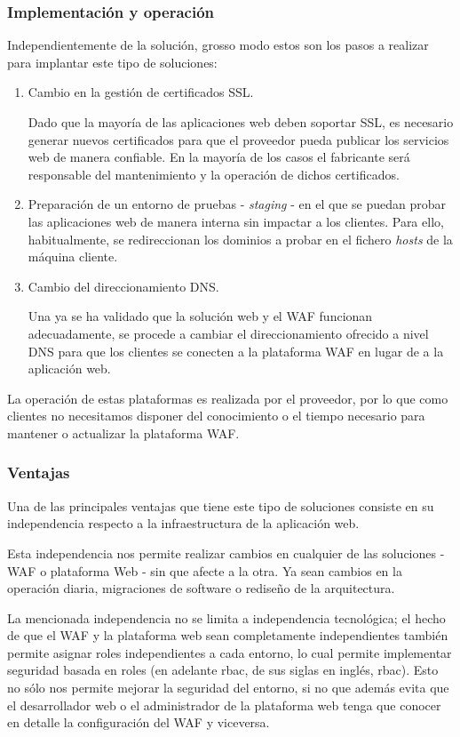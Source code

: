 \subsubsection{Implementación y operación}
\par Independientemente de la solución, grosso modo estos son los pasos a realizar para implantar este tipo de soluciones:
\begin{enumerate}
  \item Cambio en la gestión de certificados SSL.
    \par Dado que la mayoría de las aplicaciones web deben soportar SSL, es necesario generar nuevos certificados para que el proveedor pueda
    publicar los servicios web de manera confiable. En la mayoría de los casos el fabricante será responsable del mantenimiento y la operación
    de dichos certificados.
  \item Preparación de un entorno de pruebas - {\em staging} - en el que se puedan probar las aplicaciones web de manera interna sin impactar
    a los clientes. Para ello, habitualmente, se redireccionan los dominios a probar en el fichero {\em hosts} de la máquina cliente.
  \item Cambio del direccionamiento DNS.
    \par Una ya se ha validado que la solución web y el WAF funcionan adecuadamente, se procede a cambiar el direccionamiento ofrecido a nivel
    DNS para que los clientes se conecten a la plataforma WAF en lugar de a la aplicación web.
\end{enumerate}

\par La operación de estas plataformas es realizada por el proveedor, por lo que como clientes no necesitamos disponer del conocimiento o el
tiempo necesario para mantener o actualizar la plataforma WAF.

\subsubsection{Ventajas}
\par Una de las principales ventajas que tiene este tipo de soluciones consiste en su independencia respecto a la infraestructura de la
aplicación web.
\par Esta independencia nos permite realizar cambios en cualquier de las soluciones - WAF o plataforma Web - sin que afecte a la otra. Ya sean
cambios en la operación diaria, migraciones de software o rediseño de la arquitectura.
\par La mencionada independencia no se limita a independencia tecnológica; el hecho de que el WAF y la plataforma web sean completamente
independientes también permite asignar roles independientes a cada entorno, lo cual permite implementar seguridad basada en roles (en adelante
\acrshort{rbac}, de sus siglas en inglés, \acrlong{rbac}). Esto no sólo nos permite mejorar la seguridad del entorno, si no que además evita
que el desarrollador web o el administrador de la plataforma web tenga que conocer en detalle la configuración del WAF y viceversa.

